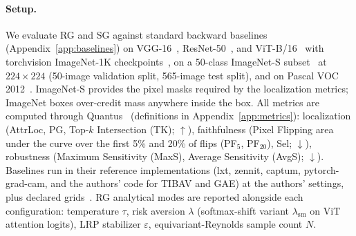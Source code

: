 \documentclass[twoside]{article}
\newcommand{\1}{\mathbf{1}}
\newif\ifprelim \prelimtrue
\newcommand{\PrelimTag}{\ifprelim\ \textcolor{red}{\textbf{[PRELIMINARY NUMBERS]}}\fi}
\begin{document}
\begin{table}[t]
    \centering
    \caption{ViT-B/16 on the ImageNet-S test split ($n{=}565$; MaxS/AvgS on a fixed random subset of
    200 test images). \textbf{Bold}, dark shading: best in column; $^{\approx}$, light shading: not
    significantly different from the best (paired bootstrap / McNemar, Holm-corrected, $p\ge0.05$);
    small numbers: 95\% percentile-bootstrap confidence intervals over test images
    (Appendix~\ref{app:stats}). One row per method, selected on the validation split by the
    localization rank-sum (faithfulness-selected rows and further baselines:
    Appendix~\ref{app:results}); the RG anchor is the exact $\alpha\beta$-\ac{LRP} representation
    (Theorem~\ref{thm:lrp-recovery}). $t$/img: seconds per image on one GPU. Config: SmoothGrad
    averages $N$ samples at noise level $\sigma$ relative to the input range; LRP-$\gamma$ has
    stabilizer $\varepsilon$ and positive-weight boost $\gamma$; AttnLRP has layer-type parameters
    $\gamma_{\mathrm{conv}}, \gamma_{\mathrm{lin}}, \varepsilon_{\mathrm{attn}}$; KernelSHAP draws $N$
    samples for $M$ superpixels; \ac{RG} modes as in Table~\ref{tab:modes}.\PrelimTag}
    \label{tab:eval-vit}
    \scriptsize
    \resizebox{\textwidth}{!}{}
\end{table}

\paragraph{Setup.}
We evaluate \ac{RG} and \ac{SG} against standard backward baselines (Appendix~\ref{app:baselines})
on VGG-16~\citep{Simonyan2015}, ResNet-50~\citep{He2016resnet}, and
ViT-B/16~\citep{Dosovitskiy2021vit} with torchvision ImageNet-1K
checkpoints~\citep{paszke2019pytorch,Deng2009imagenet,Russakovsky2015ilsvrc}, on a 50-class
ImageNet-S subset~\citep{gao2022luss} at $224{\times}224$ (50-image validation split, 565-image
test split), and on Pascal VOC 2012~\citep{Everingham2010voc}. ImageNet-S provides the pixel masks
required by the localization metrics; ImageNet boxes over-credit mass anywhere inside the box. All
metrics are computed through Quantus~\citep{hedstrom2023quantus} (definitions in
Appendix~\ref{app:metrics}): localization (\ac{AttrLoc}, \ac{PG}, Top-$k$ Intersection (TK);
$\uparrow$), faithfulness (Pixel Flipping area under the curve over the first 5\% and 20\% of flips
(PF$_5$, PF$_{20}$), \ac{Sel}; $\downarrow$), robustness (Maximum Sensitivity (MaxS), Average
Sensitivity (AvgS); $\downarrow$). Baselines run in their reference implementations (lxt, zennit,
captum, pytorch-grad-cam, and the authors' code for \acs{TIBAV} and \acs{GAE}) at the authors'
settings, plus declared grids~\citep{achtibat2024attnlrp, Anders2021zennit, Kokhlikyan2020captum,
Gildenblat2021gradcam, Chefer2021transformer, Chefer2021genatt}. \ac{RG} analytical modes are
reported alongside each configuration: temperature $\tau$, risk aversion $\lambda$ (softmax-shift
variant $\lambda_{\mathrm{sm}}$ on \ac{ViT} attention logits), \ac{LRP} stabilizer $\varepsilon$,
equivariant-Reynolds sample count $N$.
\end{document}
